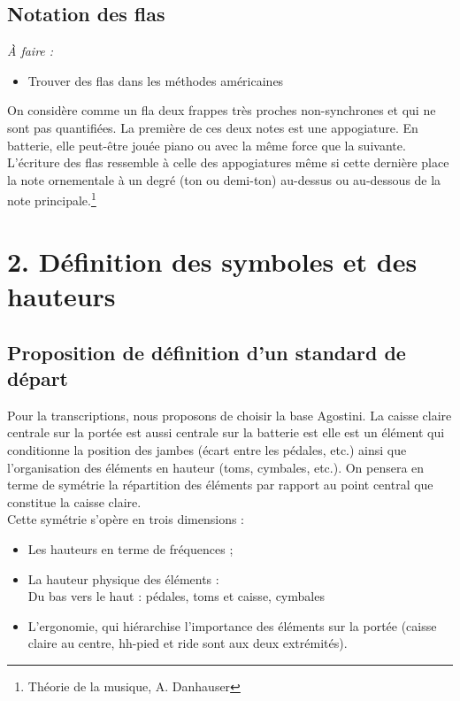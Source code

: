 \subsection*{Notation des flas}
\textit{À faire :}
\begin{itemize}
	\item Trouver des flas dans les méthodes américaines\\
\end{itemize}
On considère comme un fla deux frappes très proches non-synchrones et qui ne sont pas quantifiées. La première de ces deux notes est une appogiature. En batterie, elle peut-être jouée piano ou avec la même force que la suivante.
L’écriture des flas ressemble à celle des appogiatures même si cette dernière place la note ornementale à un degré (ton ou demi-ton) au-dessus ou au-dessous de la note principale.\footnote{Théorie de la musique, A. Danhauser}
\section*{2. Définition des symboles et des hauteurs}
\subsection*{Proposition de définition d’un standard de départ}
Pour la transcriptions, nous proposons de choisir la base Agostini. La caisse claire centrale sur la portée est aussi centrale sur la batterie est elle est un élément qui conditionne la position des jambes (écart entre les pédales, etc.) ainsi que l’organisation des éléments en hauteur (toms, cymbales, etc.).
On pensera en terme de symétrie la répartition des éléments par rapport au point central que constitue la caisse claire.\\
Cette symétrie s’opère en trois dimensions :
\begin{itemize}
	\item Les hauteurs en terme de fréquences ;
	\item La hauteur physique des éléments :\\
	Du bas vers le haut : pédales, toms et caisse, cymbales
	\item L’ergonomie, qui hiérarchise l’importance des éléments sur la portée (caisse claire au centre, hh-pied et ride sont aux deux extrémités).
\end{itemize}
